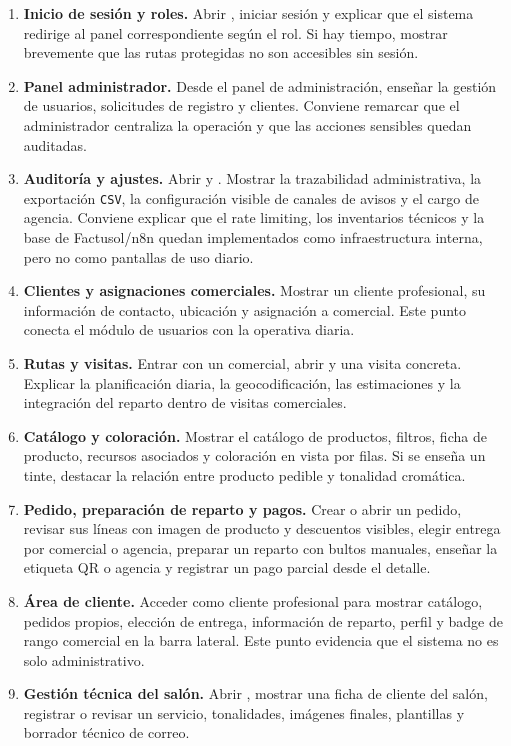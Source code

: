 \begin{enumerate}
    \item \textbf{Inicio de sesión y roles.} Abrir , iniciar sesión y explicar que el sistema redirige al panel correspondiente según el rol. Si hay tiempo, mostrar brevemente que las rutas protegidas no son accesibles sin sesión.
    \item \textbf{Panel administrador.} Desde el panel de administración, enseñar la gestión de usuarios, solicitudes de registro y clientes. Conviene remarcar que el administrador centraliza la operación y que las acciones sensibles quedan auditadas.
    \item \textbf{Auditoría y ajustes.} Abrir  y . Mostrar la trazabilidad administrativa, la exportación \texttt{CSV}, la configuración visible de canales de avisos y el cargo de agencia. Conviene explicar que el rate limiting, los inventarios técnicos y la base de Factusol/n8n quedan implementados como infraestructura interna, pero no como pantallas de uso diario.
    \item \textbf{Clientes y asignaciones comerciales.} Mostrar un cliente profesional, su información de contacto, ubicación y asignación a comercial. Este punto conecta el módulo de usuarios con la operativa diaria.
    \item \textbf{Rutas y visitas.} Entrar con un comercial, abrir  y una visita concreta. Explicar la planificación diaria, la geocodificación, las estimaciones y la integración del reparto dentro de visitas comerciales.
    \item \textbf{Catálogo y coloración.} Mostrar el catálogo de productos, filtros, ficha de producto, recursos asociados y coloración en vista por filas. Si se enseña un tinte, destacar la relación entre producto pedible y tonalidad cromática.
    \item \textbf{Pedido, preparación de reparto y pagos.} Crear o abrir un pedido, revisar sus líneas con imagen de producto y descuentos visibles, elegir entrega por comercial o agencia, preparar un reparto con bultos manuales, enseñar la etiqueta QR o agencia y registrar un pago parcial desde el detalle.
    \item \textbf{Área de cliente.} Acceder como cliente profesional para mostrar catálogo, pedidos propios, elección de entrega, información de reparto, perfil y badge de rango comercial en la barra lateral. Este punto evidencia que el sistema no es solo administrativo.
    \item \textbf{Gestión técnica del salón.} Abrir , mostrar una ficha de cliente del salón, registrar o revisar un servicio, tonalidades, imágenes finales, plantillas y borrador técnico de correo.

\end{enumerate}
